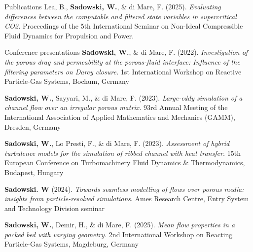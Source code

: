 \documentclass[a4paper, 10pt]{article}
\def \parspace {0.5em}
\begin{document}
{\begin{cvsection}{Publications}
		\vspace{0.5em}
		Lea, B., \textbf{Sadowski, W.}, \& di Mare, F. (2025).
		\textit{Evaluating differences between the computable and ﬁltered state variables in supercritical CO2.}
		Proceedings of the 5th International Seminar on Non-Ideal Compressible Fluid Dynamics for Propulsion and Power. \par
		\vspace{\parspace}

	\end{cvsection}
	\begin{cvsection}{Conference presentations}
		\textbf{Sadowski, W.}, \& di Mare, F. (2022).
		\textit{Investigation of the porous drag and permeability at the porous-fluid interface: Influence of the filtering parameters on Darcy closure.}
		1st International Workshop on Reactive Particle-Gas Systems, Bochum, Germany

		\vspace{0.5em}
		\textbf{Sadowski, W.}, Sayyari, M., \& di Mare, F. (2023).
		\textit{Large-eddy simulation of a channel flow over an irregular porous matrix.}
		93rd Annual Meeting of the International Association of Applied Mathematics and Mechanics (GAMM), Dresden, Germany

		\vspace{0.5em}
		\textbf{Sadowski, W.}, Lo Presti, F., \& di Mare, F. (2023).
		\textit{Assessment of hybrid turbulence models for the simulation of ribbed channel with heat transfer.}
		15th European Conference on Turbomachinery Fluid Dynamics \& Thermodynamics, Budapest, Hungary

		\vspace{0.5em}
		\textbf{Sadowski. W} (2024).
		\textit{Towards seamless modelling of flows over porous media: insights from particle-resolved simulations}.
		Ames Research Centre, Entry System and Technology Division seminar

		\vspace{0.5em}
		\textbf{Sadowski, W.}, Demir, H., \& di Mare, F. (2025).
		\textit{Mean flow properties in a packed bed with varying  geometry.}
		2nd International Workshop on Reacting Particle-Gas Systems, Magdeburg, Germany

	\end{cvsection}
}{%

}
\end{document}
